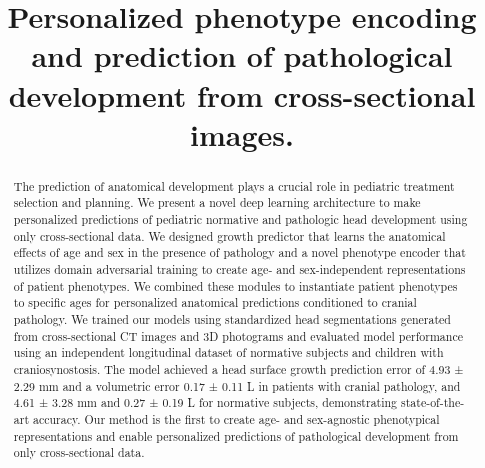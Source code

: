 \documentclass[conference]{IEEEtran}
\begin{document}
\title{Personalized phenotype encoding and prediction of pathological development from cross-sectional images.\\
}

\author{
}


\maketitle

\begin{abstract}
The prediction of anatomical development plays a crucial role in pediatric treatment selection and planning. We present a novel deep learning architecture to make personalized predictions of pediatric normative and pathologic head development using only cross-sectional data. We designed growth predictor that learns the anatomical effects of age and sex in the presence of pathology and a novel phenotype encoder that utilizes domain adversarial training to create age- and sex-independent representations of patient phenotypes. We combined these modules to instantiate patient phenotypes to specific ages for personalized anatomical predictions conditioned to cranial pathology. We trained our models using standardized head segmentations generated from cross-sectional CT images and 3D photograms and evaluated model performance using an independent longitudinal dataset of normative subjects and children with craniosynostosis. The model achieved a head surface growth prediction error of 4.93 ± 2.29 mm and a volumetric error 0.17 ± 0.11 L in patients with cranial pathology, and 4.61 ± 3.28 mm and 0.27 ± 0.19 L for normative subjects, demonstrating state-of-the-art accuracy. Our method is the first to create age- and sex-agnostic phenotypical representations and enable personalized predictions of pathological development from only cross-sectional data.
\end{abstract}
\end{document}
